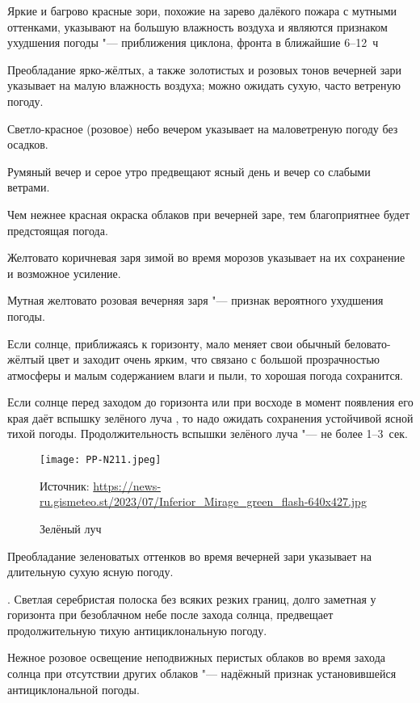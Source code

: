  Яркие и багрово красные зори, похожие на зарево далёкого
пожара с мутными оттенками, указывают на большую влажность воздуха и
являются признаком ухудшения погоды "--- приближения циклона, фронта в
ближайшие 6--12~ч

 Преобладание ярко-жёлтых, а также золотистых и розовых тонов
вечерней зари указывает на малую влажность воздуха; можно ожидать
сухую, часто ветреную погоду.

 Светло-красное (розовое) небо вечером указывает на маловетреную
погоду без осадков.

 Румяный вечер и серое утро предвещают ясный день и вечер со
слабыми ветрами.

 Чем нежнее красная окраска облаков при вечерней заре, тем
благоприятнее будет предстоящая погода.

 Желтовато коричневая заря зимой во время морозов указывает на их
сохранение и возможное усиление.

 Мутная желтовато розовая вечерняя заря "--- признак вероятного
ухудшения погоды.

 Если солнце, приближаясь к горизонту, мало меняет свои обычный
беловато-жёлтый цвет и заходит очень ярким, что связано с большой
прозрачностью атмосферы и малым содержанием влаги и пыли, то хорошая
погода сохранится.

 Если солнце перед заходом до горизонта или при восходе в момент
появления его края даёт вспышку зелёного луча , то надо ожидать
сохранения устойчивой ясной тихой погоды. Продолжительность вспышки
зелёного луча "--- не более 1--3~сек.

\begin{figure}[htb]
  \centering{}
  \texttt{[image: PP-N211.jpeg]}
  \caption{Зелёный луч}
  \label{fig:pp-n211}
  \scriptsize
  \centering{}Источник: \url{https://news-ru.gismeteo.st/2023/07/Inferior_Mirage_green_flash-640x427.jpg}
\end{figure}

 Преобладание зеленоватых оттенков во время вечерней зари
указывает на длительную сухую ясную погоду.

. Светлая серебристая полоска без всяких резких границ, долго
заметная у горизонта при безоблачном небе после захода солнца,
предвещает продолжительную тихую антициклональную погоду.

 Нежное розовое освещение неподвижных перистых облаков во время
захода солнца при отсутствии других облаков "--- надёжный признак
установившейся антициклональной погоды.

